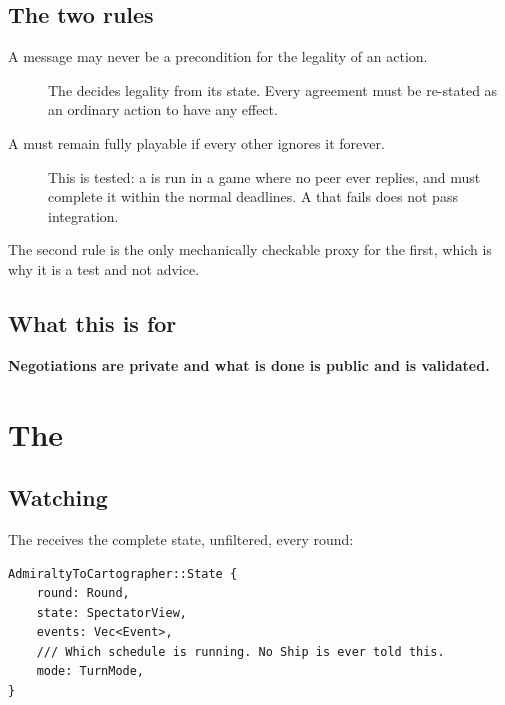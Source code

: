 \documentclass{article}
\begin{document}
\subsection{The two rules}

\begin{description}
    \item[A message may never be a precondition for the legality of an action.] The \chart{}
      decides legality from its state. Every \ships agreement must be re-stated as an ordinary action to have any
      effect.
    \item[A \ship{} must remain fully playable if every other \ship{} ignores it forever.] This is
      tested: a \ship{} is run in a game where no peer ever replies, and must complete it within the
      normal deadlines. A \ship{} that fails does not pass integration.
\end{description}

The second rule is the only mechanically checkable proxy for the first, which is why it is a test
and not advice.

\subsection{What this is for}

\textbf{Negotiations are private and what is done is public and is validated.}

% 


\newpage
\section{The \cartographer}
\label{proto:cartographer}

\subsection{Watching}

The \cartographer{} receives the complete state, unfiltered, every round:

\begin{lstlisting}
AdmiraltyToCartographer::State {
    round: Round,
    state: SpectatorView,
    events: Vec<Event>,
    /// Which schedule is running. No Ship is ever told this.
    mode: TurnMode,
}
\end{lstlisting}
\end{document}
